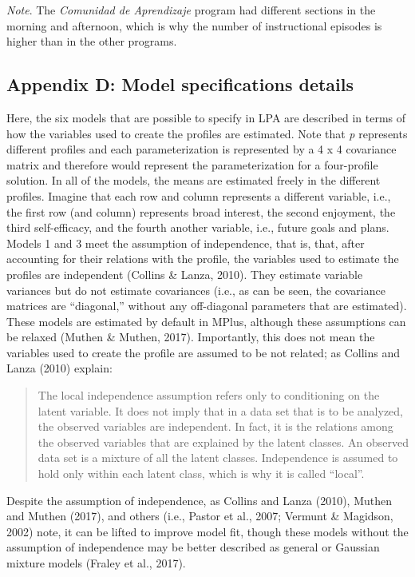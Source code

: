 \documentclass[]{msu-thesis}
\theoremstyle{definition}
\theoremstyle{definition}
\theoremstyle{definition}
\theoremstyle{remark}
\begin{document}
\emph{Note}. The \emph{Comunidad de Aprendizaje} program had different
sections in the morning and afternoon, which is why the number of
instructional episodes is higher than in the other programs.

\subsection{Appendix D: Model specifications
details}\label{appendix-d-model-specifications-details}

Here, the six models that are possible to specify in LPA are described
in terms of how the variables used to create the profiles are estimated.
Note that \emph{p} represents different profiles and each
parameterization is represented by a 4 x 4 covariance matrix and
therefore would represent the parameterization for a four-profile
solution. In all of the models, the means are estimated freely in the
different profiles. Imagine that each row and column represents a
different variable, i.e., the first row (and column) represents broad
interest, the second enjoyment, the third self-efficacy, and the fourth
another variable, i.e., future goals and plans. Models 1 and 3 meet the
assumption of independence, that is, that, after accounting for their
relations with the profile, the variables used to estimate the profiles
are independent (Collins \& Lanza, 2010). They estimate variable
variances but do not estimate covariances (i.e., as can be seen, the
covariance matrices are ``diagonal,'' without any off-diagonal
parameters that are estimated). These models are estimated by default in
MPlus, although these assumptions can be relaxed (Muthen \& Muthen,
2017). Importantly, this does not mean the variables used to create the
profile are assumed to be not related; as Collins and Lanza (2010)
explain:

\begin{quote}
The local independence assumption refers only to conditioning on the
latent variable. It does not imply that in a data set that is to be
analyzed, the observed variables are independent. In fact, it is the
relations among the observed variables that are explained by the latent
classes. An observed data set is a mixture of all the latent classes.
Independence is assumed to hold only within each latent class, which is
why it is called ``local''.
\end{quote}

Despite the assumption of independence, as Collins and Lanza (2010),
Muthen and Muthen (2017), and others (i.e., Pastor et al., 2007; Vermunt
\& Magidson, 2002) note, it can be lifted to improve model fit, though
these models without the assumption of independence may be better
described as general or Gaussian mixture models (Fraley et al., 2017).
\end{document}
